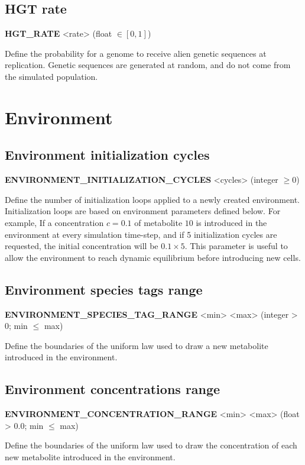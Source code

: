 \subsection{HGT rate}
\begin{center}
{\bf HGT\_RATE} <rate> (float $\in [0, 1]$)
\end{center}
Define the probability for a genome to receive alien genetic sequences at replication. Genetic sequences are generated at random, and do not come from the simulated population.


\section{Environment}

\subsection{Environment initialization cycles}
\begin{center}
{\bf ENVIRONMENT\_INITIALIZATION\_CYCLES} <cycles> (integer $\ge 0$)
\end{center}
Define the number of initialization loops applied to a newly created environment. Initialization loops are based on environment parameters defined below. For example, If a concentration $c = 0.1$ of metabolite $10$ is introduced in the environment at every simulation time-step, and if 5 initialization cycles are requested, the initial concentration will be $0.1 \times 5$. This parameter is useful to allow the environment to reach dynamic equilibrium before introducing new cells.


\subsection{Environment species tags range}
\begin{center}
{\bf ENVIRONMENT\_SPECIES\_TAG\_RANGE} <min> <max> (integer > 0; min $\le$ max)
\end{center}
Define the boundaries of the uniform law used to draw a new metabolite introduced in the environment.


\subsection{Environment concentrations range}
\begin{center}
{\bf ENVIRONMENT\_CONCENTRATION\_RANGE} <min> <max> (float > 0.0; min $\le$ max)
\end{center}
Define the boundaries of the uniform law used to draw the concentration of each new metabolite introduced in the environment.

